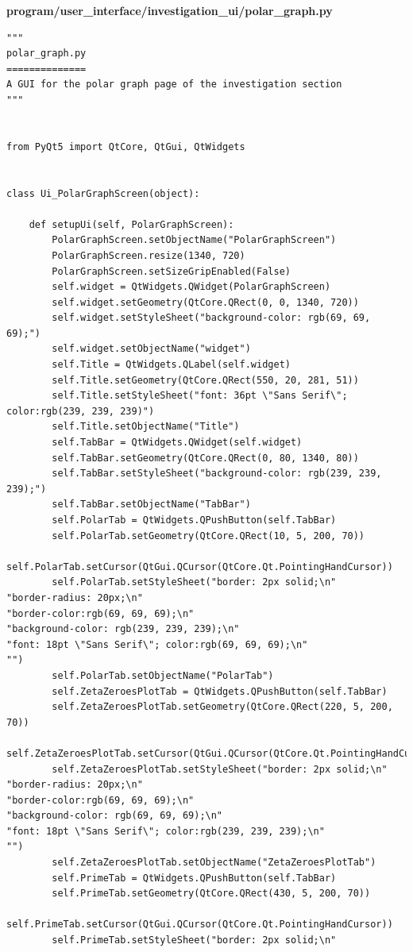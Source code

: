 \documentclass{article}
\begin{document}
\textbf{program/user\_interface/investigation\_ui/polar\_graph.py}

\begin{lstlisting}
"""
polar_graph.py
==============
A GUI for the polar graph page of the investigation section
"""


from PyQt5 import QtCore, QtGui, QtWidgets


class Ui_PolarGraphScreen(object):

    def setupUi(self, PolarGraphScreen):
        PolarGraphScreen.setObjectName("PolarGraphScreen")
        PolarGraphScreen.resize(1340, 720)
        PolarGraphScreen.setSizeGripEnabled(False)
        self.widget = QtWidgets.QWidget(PolarGraphScreen)
        self.widget.setGeometry(QtCore.QRect(0, 0, 1340, 720))
        self.widget.setStyleSheet("background-color: rgb(69, 69, 69);")
        self.widget.setObjectName("widget")
        self.Title = QtWidgets.QLabel(self.widget)
        self.Title.setGeometry(QtCore.QRect(550, 20, 281, 51))
        self.Title.setStyleSheet("font: 36pt \"Sans Serif\"; color:rgb(239, 239, 239)")
        self.Title.setObjectName("Title")
        self.TabBar = QtWidgets.QWidget(self.widget)
        self.TabBar.setGeometry(QtCore.QRect(0, 80, 1340, 80))
        self.TabBar.setStyleSheet("background-color: rgb(239, 239, 239);")
        self.TabBar.setObjectName("TabBar")
        self.PolarTab = QtWidgets.QPushButton(self.TabBar)
        self.PolarTab.setGeometry(QtCore.QRect(10, 5, 200, 70))
        self.PolarTab.setCursor(QtGui.QCursor(QtCore.Qt.PointingHandCursor))
        self.PolarTab.setStyleSheet("border: 2px solid;\n"
"border-radius: 20px;\n"
"border-color:rgb(69, 69, 69);\n"
"background-color: rgb(239, 239, 239);\n"
"font: 18pt \"Sans Serif\"; color:rgb(69, 69, 69);\n"
"")
        self.PolarTab.setObjectName("PolarTab")
        self.ZetaZeroesPlotTab = QtWidgets.QPushButton(self.TabBar)
        self.ZetaZeroesPlotTab.setGeometry(QtCore.QRect(220, 5, 200, 70))
        self.ZetaZeroesPlotTab.setCursor(QtGui.QCursor(QtCore.Qt.PointingHandCursor))
        self.ZetaZeroesPlotTab.setStyleSheet("border: 2px solid;\n"
"border-radius: 20px;\n"
"border-color:rgb(69, 69, 69);\n"
"background-color: rgb(69, 69, 69);\n"
"font: 18pt \"Sans Serif\"; color:rgb(239, 239, 239);\n"
"")
        self.ZetaZeroesPlotTab.setObjectName("ZetaZeroesPlotTab")
        self.PrimeTab = QtWidgets.QPushButton(self.TabBar)
        self.PrimeTab.setGeometry(QtCore.QRect(430, 5, 200, 70))
        self.PrimeTab.setCursor(QtGui.QCursor(QtCore.Qt.PointingHandCursor))
        self.PrimeTab.setStyleSheet("border: 2px solid;\n"

\end{lstlisting}
\end{document}
